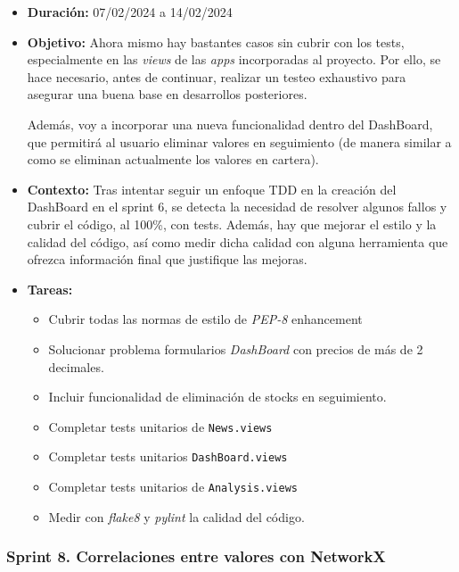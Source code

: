 \begin{itemize}
\item  
\textbf{Duración:} 07/02/2024 a 14/02/2024

\item
\textbf{Objetivo:} Ahora mismo hay bastantes casos sin cubrir con los tests, especialmente en las \emph{views} de las \emph{apps} incorporadas al proyecto. Por ello, se hace necesario, antes de continuar, realizar un testeo exhaustivo para asegurar una buena base en desarrollos posteriores. 

Además, voy a incorporar una nueva funcionalidad dentro del DashBoard, que permitirá al usuario eliminar valores en seguimiento (de manera similar a como se eliminan actualmente los valores en cartera).

\item
\textbf{Contexto:} Tras intentar seguir un enfoque TDD en la creación del DashBoard en el sprint 6, se detecta la necesidad de resolver algunos fallos y cubrir el código, al 100\%, con tests. Además, hay que mejorar el estilo y la calidad del código, así como medir dicha calidad con alguna herramienta que ofrezca información final que justifique las mejoras. 

\item
\textbf{Tareas:}
	\begin{itemize}
	\tightlist
	\item 
	Cubrir todas las normas de estilo de \emph{PEP-8} enhancement
	\item
	Solucionar problema formularios \emph{DashBoard} con precios de más de 2 decimales.
	\item
	Incluir funcionalidad de eliminación de stocks en seguimiento.
	\item
	Completar tests unitarios de \texttt{News.views}
	\item
	Completar tests unitarios \texttt{DashBoard.views}
	\item
	Completar tests unitarios de \texttt{Analysis.views}
	\item
	Medir con \emph{flake8} y \emph{pylint} la calidad del código.
  	\end{itemize}
\end{itemize}


\subsubsection{Sprint 8. Correlaciones entre valores con NetworkX}

